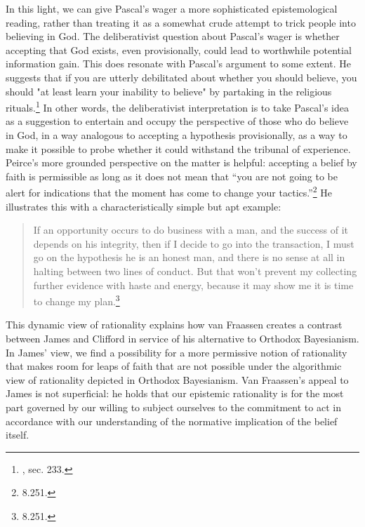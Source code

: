  
 In this light, we can give Pascal's wager a more sophisticated epistemological reading, rather than treating it as a somewhat crude attempt to trick people into believing in God. The deliberativist question about Pascal's wager is whether accepting that God exists, even provisionally, could lead to worthwhile potential information gain. This does resonate with Pascal's argument to some extent. He suggests that if you are utterly debilitated about whether you should believe, you should "at least learn your inability to believe" by partaking in the religious rituals.\footnote{\cite{pascal}, sec. 233.} In other words, the deliberativist interpretation is to take Pascal's idea as a suggestion to entertain and occupy the perspective of those who do believe in God, in a way analogous to accepting a hypothesis provisionally, as a way to make it possible to probe whether it could withstand the tribunal of experience. Peirce's more grounded perspective on the matter is helpful: accepting a belief by faith is permissible as long as it does not mean that ``you are not going to be alert for indications that the moment has come to change your tactics.''\footnote{\cite{CP} 8.251.} He illustrates this with a characteristically simple but apt example:

\begin{quote}
	If an opportunity occurs to do business with a man, and the success of it depends on his integrity, then if I decide to go into the transaction, I must go on the hypothesis he is an honest man, and there is no sense at all in halting between two lines of conduct. But that won't prevent my collecting further evidence with haste and energy, because it may show me it is time to change my plan.\footnote{\cite{CP} 8.251.}
\end{quote}




This dynamic view of rationality explains how van Fraassen creates a contrast between James
and Clifford in service of his alternative to Orthodox Bayesianism. In
James' view, we find a possibility for a more permissive notion of
rationality that makes room for leaps of faith that are not possible
under the algorithmic view of rationality depicted in Orthodox
Bayesianism. Van Fraassen's appeal to James is not superficial: he holds that our epistemic rationality is for the most part governed by our willing to subject ourselves to the commitment to act in accordance with our understanding of the normative implication of the belief itself. 

